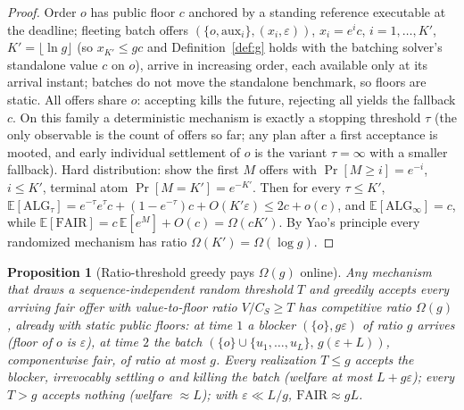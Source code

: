 \documentclass[11pt]{article}
\newtheorem{proposition}{Proposition}
\theoremstyle{remark}
\newcommand{\FAIR}{\mathrm{FAIR}}
\newcommand{\E}{\mathbb{E}}
\begin{document}
\begin{proof}
Order $o$ has public floor $c$ anchored by a standing reference
executable at the deadline; fleeting batch offers
$(\{o,\mathrm{aux}_i\},(x_i,\varepsilon))$, $x_i=e^ic$,
$i=1,\dots,K'$, $K'=\lfloor\ln g\rfloor$ (so $x_{K'}\le gc$ and
Definition~\ref{def:g} holds with the batching solver's standalone value
$c$ on $o$), arrive in increasing order, each available only at its
arrival instant; batches do not move the standalone benchmark, so floors
are static. All offers share $o$: accepting kills the future, rejecting
all yields the fallback $c$. On this family a deterministic mechanism is
exactly a stopping threshold $\tau$ (the only observable is the count of
offers so far; any plan after a first acceptance is mooted, and early
individual settlement of $o$ is the variant $\tau=\infty$ with a smaller
fallback). Hard distribution: show the first $M$ offers with
$\Pr[M\ge i]=e^{-i}$, $i\le K'$, terminal atom $\Pr[M=K']=e^{-K'}$.
Then for every $\tau\le K'$,
$\E[\mathrm{ALG}_\tau]=e^{-\tau}e^{\tau}c+(1-e^{-\tau})c
+O(K'\varepsilon)\le2c+o(c)$, and $\E[\mathrm{ALG}_\infty]=c$, while
$\E[\FAIR]=c\,\E[e^M]+O(c)=\Omega(cK')$. By Yao's principle every
randomized mechanism has ratio $\Omega(K')=\Omega(\log g)$.
\end{proof}

\begin{proposition}[Ratio-threshold greedy pays $\Omega(g)$ online]
\label{prop:onlinegreedy}
Any mechanism that draws a sequence-independent random threshold $T$ and
greedily accepts every arriving fair offer with value-to-floor ratio
$V/C_S\ge T$ has competitive ratio $\Omega(g)$, already with static
public floors: at time $1$ a blocker $(\{o\},g\varepsilon)$ of ratio $g$
arrives (floor of $o$ is $\varepsilon$), at time $2$ the batch
$(\{o\}\cup\{u_1,\dots,u_L\},\,g(\varepsilon+L))$, componentwise fair,
of ratio at most $g$. Every realization $T\le g$ accepts the blocker,
irrevocably settling $o$ and killing the batch (welfare at most
$L+g\varepsilon$); every $T>g$ accepts nothing (welfare $\approx L$);
with $\varepsilon\ll L/g$, $\FAIR\approx gL$.
\end{proposition}
\end{document}
